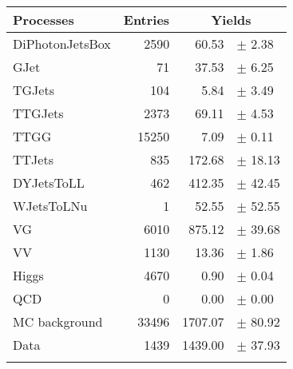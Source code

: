 {\renewcommand{\arraystretch}{1.0}
\begin{center}
\begin{tabular}{lrrl}
\hline\hline
Processes & Entries &\multicolumn{2}{c}{Yields}\\
\hline\hline
DiPhotonJetsBox  & 	            2590 & 	           60.53 & $\pm$ 	       2.38\\
GJet		 & 	              71 & 	           37.53 & $\pm$ 	       6.25\\
TGJets		 & 	             104 & 	            5.84 & $\pm$ 	       3.49\\
TTGJets		 & 	            2373 & 	           69.11 & $\pm$ 	       4.53\\
TTGG		 & 	           15250 & 	            7.09 & $\pm$ 	       0.11\\
TTJets		 & 	             835 & 	          172.68 & $\pm$ 	      18.13\\
DYJetsToLL	 & 	             462 & 	          412.35 & $\pm$ 	      42.45\\
WJetsToLNu	 & 	               1 & 	           52.55 & $\pm$ 	      52.55\\
VG		 & 	            6010 & 	          875.12 & $\pm$ 	      39.68\\
VV		 & 	            1130 & 	           13.36 & $\pm$ 	       1.86\\
Higgs		 & 	            4670 & 	            0.90 & $\pm$ 	       0.04\\
QCD		 & 	               0 & 	            0.00 & $\pm$ 	       0.00\\
\hline
MC background	 & 	           33496 & 	         1707.07 & $\pm$ 	      80.92\\
Data		 & 	            1439 & 	         1439.00 & $\pm$ 	      37.93\\
\hline\hline\\
\end{tabular}
\end{center}
}
